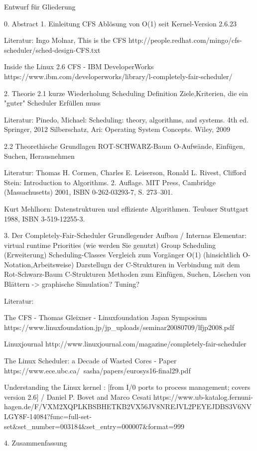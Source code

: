 Entwurf für Gliederung


0. Abstract
1. Einleitung
	 CFS Ablösung von O(1) seit Kernel-Version 2.6.23

	 Literatur:
	 Ingo Molnar, This is the CFS
		http://people.redhat.com/mingo/cfs-scheduler/sched-design-CFS.txt

	Inside the Linux 2.6 CFS - IBM DeveloperWorks
		https://www.ibm.com/developerworks/library/l-completely-fair-scheduler/

2. Theorie
2.1 kurze Wiederholung Scheduling
	 Definition
	 Ziele,Kriterien, die ein "guter" Scheduler Erfüllen muss

	 Literatur:
	 Pinedo, Michael: Scheduling: theory, algorithms, and systems. 4th ed.
	 Springer, 2012
	 Silberschatz, Ari: Operating System Concepts. Wiley, 2009

2.2 Theorethische Grundlagen ROT-SCHWARZ-Baum
	O-Aufwände, Einfügen, Suchen, Herausnehmen

	 Literatur:
	 Thomas H. Cormen, Charles E. Leiserson, Ronald L. Rivest, Clifford Stein: Introduction to Algorithms. 2. Auflage. MIT Press, Cambridge (Massachusetts) 2001, ISBN 0-262-03293-7, S. 273–301.

	 Kurt Mehlhorn: Datenstrukturen und effiziente Algorithmen. Teubner Stuttgart 1988, ISBN 3-519-12255-3.

3. Der Completely-Fair-Scheduler
  Grundlegender Aufbau / Internas
		Elementar: virtual runtime
		Priorities (wie werden Sie genutzt)
		Group Scheduling (Erweiterung)
		Scheduling-Classes
	Vergleich zum Vorgänger O(1) (hinsichtlich O-Notation,Arbeitsweise)
	Darstellugn der C-Strukturen in Verbindung mit dem Rot-Schwarz-Baum
		C-Strukturen
		Methoden zum Einfügen, Suchen, Löschen von Blättern -> graphische Simulation?
	Tuning?

		Literatur:

		The CFS - Thomas Gleixner - Linuxfoundation Japan Symposium
			https://www.linuxfoundation.jp/jp_uploads/seminar20080709/lfjp2008.pdf

		Linuxjournal
			http://www.linuxjournal.com/magazine/completely-fair-scheduler

		The Linux Scheduler: a Decade of Wasted Cores - Paper
			https://www.ece.ubc.ca/~sasha/papers/eurosys16-final29.pdf

		Understanding the Linux kernel : [from I/0 ports to process management; covers version 2.6] / Daniel P. Bovet and Marco Cesati
			https://www.ub-katalog.fernuni-hagen.de/F/VXM2XQPLKBSBHETKB2VX56JV8NREJVL2PEYEJDBS3V6NVLGY8F-14084?func=full-set-set&set_number=003184&set_entry=000007&format=999

4. Zusammenfassung
